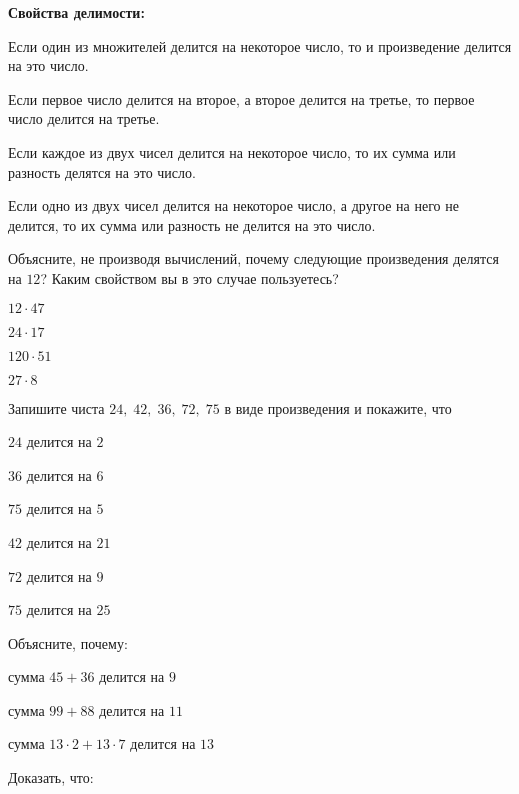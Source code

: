 \begin{class}[number=1]
\begin{listofex}
	\item \textbf{Свойства делимости:}
	\begin{enumcols}[itemcolumns=1]
		\item Если один из множителей делится на некоторое число, то и произведение делится на это число.
		\item Если первое число делится на второе, а второе делится на третье, то первое число делится на третье.
		\item Если каждое из двух чисел делится на некоторое число, то их сумма или разность делятся на это число.
		\item Если одно из двух чисел делится на некоторое число, а другое на него не делится, то их сумма или разность не делится на это число.
	\end{enumcols}
	\item Объясните, не производя вычислений, почему следующие произведения делятся на \( 12 \)? Каким свойством вы в это случае пользуетесь?
	\begin{enumcols}[itemcolumns=4]
		\item \( 12\cdot47 \)
		\item \( 24\cdot17 \)
		\item \( 120\cdot51 \)
		\item \( 27\cdot8 \)
	\end{enumcols}
	\item Запишите чиста \( 24,\;42,\;36,\;72,\;75 \) в виде произведения и покажите, что
	\begin{enumcols}[itemcolumns=3]
		\item \( 24 \) делится на \( 2 \)
		\item \( 36 \) делится на \( 6 \)
		\item \( 75 \) делится на \( 5 \)
		\item \( 42 \) делится на \( 21 \)
		\item \( 72 \) делится на \( 9 \)
		\item \( 75 \) делится на \( 25 \)
	\end{enumcols}
	\item Объясните, почему:
	\begin{enumcols}[itemcolumns=2]
		\item сумма \( 45+36 \) делится на \( 9 \)
		\item сумма \( 99+88 \) делится на \( 11 \)
		\item сумма \( 13\cdot2+13\cdot7\) делится на \( 13 \)
	\end{enumcols}
	\item Доказать, что:

\end{listofex}
\end{class}
